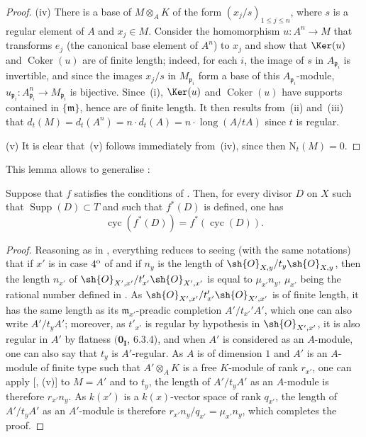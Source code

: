 \begin{proof}
(iv) There is a base of $M\otimes_A K$ of the form $(x_j/s)_{1\leq j\leq n}$, where $s$ is a regular element of $A$ and $x_j\in M$.
Consider the homomorphism $u:A^n\to M$ that transforms $e_j$ (the canonical base element of $A^n$) to $x_j$ and show that $\Ker(u)$ and $\operatorname{Coker}(u)$ are of finite length;
indeed, for each $i$, the image of $s$ in $A_{\mathfrak{p}_i}$ is invertible, and since the images $x_j/s$ in $M_{\mathfrak{p}_i}$ form a base of this $A_{\mathfrak{p}_i}$-module, $u_{\mathfrak{p}_i}:A^n_{\mathfrak{p}_i}\to M_{\mathfrak{p}_i}$ is bijective.
Since~(i), $\Ker(u)$ and $\operatorname{Coker}(u)$ have supports contained in $\{\mathfrak{m}\}$, hence are of finite length.
It then results from~(ii) and~(iii) that $d_t(M)=d_t(A^n)=n\cdot d_t(A)=n\cdot\operatorname{long}(A/tA)$ since $t$ is regular.

(v) It is clear that~(v) follows immediately from~(iv), since then $\mathrm{N}_t(M)=0$.
\end{proof}

This lemma allows to generalise :

\begin{proposition}[21.10.13]
\label{IV.21.10.13.prop}
Suppose that $f$ satisfies the conditions of .
Then, for every divisor $D$ on $X$ such that $\operatorname{Supp}(D)\subset T$ and such that $f^*(D)$ is defined, one has
\[
\label{IV.21.10.13.1}
  \operatorname{cyc}(f^*(D))=f^*(\operatorname{cyc}(D)).
  \tag{21.10.13.1}
\]
\end{proposition}

\begin{proof}
Reasoning as in , everything reduces to seeing (with the same notations) that if $x'$ is in case $4\textsuperscript{o}$ of  and if $n_y$ is the length of $\sh{O}_{X,y}/t_y\sh{O}_{X,y}$, then the length $n_{x'}$ of $\sh{O}_{X',x'}/t'_{x'}\sh{O}_{X',x'}$ is equal to $\mu_{x'}n_y$, $\mu_{x'}$ being the rational number defined in .
As $\sh{O}_{X',x'}/t'_{x'}\sh{O}_{X',x'}$ is of finite length, it has the same length as its $\mathfrak{m}_{x'}$-preadic completion $A'/t_{x'}' A'$, which one can also write $A'/t_y A'$;
moreover, as $t'_{x'}$ is regular by hypothesis in $\sh{O}_{X',x'}$, it is also regular in $A'$ by flatness $(\mathbf{0_I}$, 6.3.4), and when $A'$ is considered as an $A$-module, one can also say that $t_y$ is $A'$-regular.
As $A$ is of dimension $1$ and $A'$ is an $A$-module of finite type such that $A'\otimes_A K$ is a free $K$-module of rank $r_{x'}$, one can apply [, (v)] to $M=A'$ and to $t_y$, the length of $A'/t_y A'$ as an $A$-module is therefore $r_{x'}n_y$.
As $k(x')$ is a $k(x)$-vector space of rank $q_{x'}$, the length of $A'/t_y A'$ as an $A'$-module is therefore $r_{x'}n_y/q_{x'}=\mu_{x'}n_y$, which completes the proof.
\end{proof}


